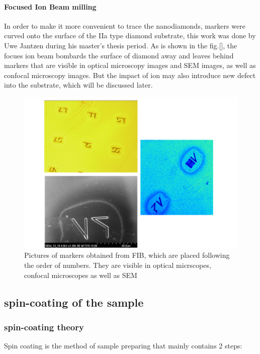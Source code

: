 \paragraph{Focused Ion Beam milling}
In order to make it more convenient to trace the nanodiamonds, markers were curved onto the surface of the IIa type diamond substrate, this work was done by Uwe Jantzen during his master's thesis period. As is shown in the fig.[], the focues ion beam bombards the surface of diamond away and leaves behind markers that are visible in optical microscopy images and SEM images, as well as confocal microscopy images. But the impact of ion may also introduce new defect into the substrate, which will be discussed later.
\FloatBarrier
\begin{figure}[h]
\centering
\includegraphics[width=1\linewidth]{Figures/pic/fib}
\caption{Pictures of markers obtained from FIB, which are placed following the order of numbers. They are visible in optical micrscopes, confocal microscopes as well as SEM   }
\label{fig:20150907sample214spincoated5}
\end{figure}
\FloatBarrier



\subsection{spin-coating of the sample}
\subsubsection{spin-coating theory} 
Spin coating is the method of sample preparing that mainly contains 2 steps:

